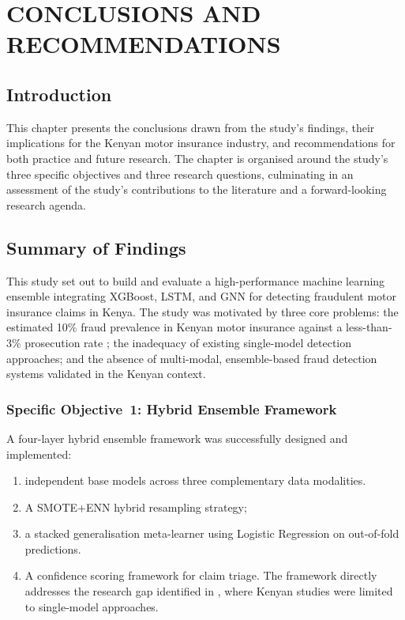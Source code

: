 \documentclass[12pt,a4paper,oneside]{report}
\numberwithin{equation}{chapter}
\begin{document}
\chapter{CONCLUSIONS AND RECOMMENDATIONS}

\section{Introduction}

This chapter presents the conclusions drawn from the study's findings, their implications for the
Kenyan motor insurance industry, and recommendations for both practice and future research. The
chapter is organised around the study's three specific objectives and three research questions,
culminating in an assessment of the study's contributions to the literature and a forward-looking
research agenda.

\section{Summary of Findings}

This study set out to build and evaluate a high-performance machine learning ensemble integrating
XGBoost, LSTM, and GNN for detecting fraudulent motor insurance claims in Kenya. The study was
motivated by three core problems: the estimated 10\% fraud prevalence in Kenyan motor insurance
against a less-than-3\% prosecution rate \cite{mainafraud,kowshalya2018predicting}; the
inadequacy of existing single-model detection approaches; and the absence of multi-modal,
ensemble-based fraud detection systems validated in the Kenyan context.

\subsection{Specific Objective~1: Hybrid Ensemble Framework}

A four-layer hybrid ensemble framework was successfully designed and implemented:
\begin{enumerate}
    \item independent base models across three complementary data modalities.
    \item A SMOTE+ENN hybrid resampling strategy; 
    \item a stacked generalisation meta-learner using Logistic Regression on out-of-fold predictions.
 \item  A confidence scoring framework for claim triage. The framework directly addresses the research gap identified in \cite{njeru2022detection}, where Kenyan studies were  limited to single-model approaches.
\end{enumerate}
\end{document}

